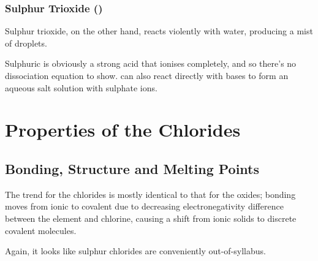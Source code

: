 			\subsubsection{Sulphur Trioxide ()}

				Sulphur trioxide, on the other hand, reacts violently with water, producing a mist of  droplets.


				Sulphuric is obviously a strong acid that ionises completely, and so there's no dissociation equation to show. 
				can also react directly with bases to form an aqueous salt solution with sulphate ions.






	\pagebreak
	\section{Properties of the Chlorides}

		\subsection{Bonding, Structure and Melting Points}

			The trend for the chlorides is mostly identical to that for the oxides; bonding moves from ionic to covalent due to decreasing
			electronegativity difference between the element and chlorine, causing a shift from ionic solids to discrete covalent molecules.

			Again, it looks like sulphur chlorides are conveniently out-of-syllabus.

